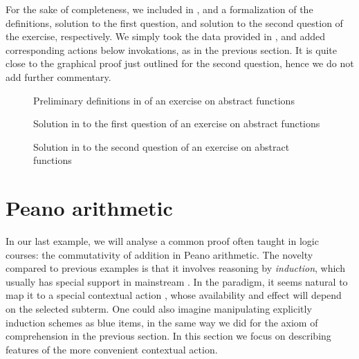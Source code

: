 For the sake of completeness, we included in ,
 and  a  formalization of the
definitions, solution to the first question, and solution to the second question
of the exercise, respectively. We simply took the data provided in
\cite{bartzia:hal-04087080}, and added corresponding  actions below 
invokations, as in the previous section. It is quite close to the graphical proof
just outlined for the second question, hence we do not add further commentary.

\begin{figure}
  
  \caption{Preliminary definitions in  of an exercise on abstract functions}
\end{figure}

\begin{figure}
  
  \caption{Solution in  to the first question of an exercise on abstract functions}
\end{figure}

\begin{figure}
  
  \caption{Solution in  to the second question of an exercise on abstract functions}
\end{figure}


\section{Peano arithmetic}

In our last example, we will analyse a common proof often taught in logic
courses: the commutativity of addition in Peano arithmetic. The novelty compared
to previous examples is that it involves reasoning by \emph{induction}, which
usually has special support in mainstream . In the
 paradigm, it seems natural to map it to a special contextual
action , whose availability and effect will depend on the
selected subterm. One could also imagine manipulating explicitly induction
schemes as blue items, in the same way we did for the axiom of comprehension in
the previous section. In this section we focus on describing features of the
more convenient contextual action.

